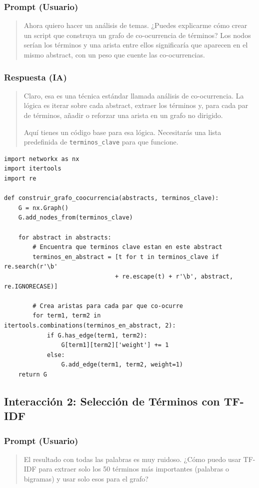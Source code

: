 \documentclass[12pt]{article}
\begin{document}
\subsubsection*{Prompt (Usuario)}
\begin{quote}
Ahora quiero hacer un análisis de temas. ¿Puedes explicarme cómo crear un script que construya un grafo de co-ocurrencia de términos? Los nodos serían los términos y una arista entre ellos significaría que aparecen en el mismo abstract, con un peso que cuente las co-ocurrencias.
\end{quote}

\subsubsection*{Respuesta (IA)}
\begin{quote}
Claro, esa es una técnica estándar llamada análisis de co-ocurrencia. La lógica es iterar sobre cada abstract, extraer los términos y, para cada par de términos, añadir o reforzar una arista en un grafo no dirigido.

Aquí tienes un código base para esa lógica. Necesitarás una lista predefinida de \texttt{terminos\_clave} para que funcione.
\end{quote}
\begin{lstlisting}
import networkx as nx
import itertools
import re

def construir_grafo_coocurrencia(abstracts, terminos_clave):
    G = nx.Graph()
    G.add_nodes_from(terminos_clave)
    
    for abstract in abstracts:
        # Encuentra que terminos clave estan en este abstract
        terminos_en_abstract = [t for t in terminos_clave if re.search(r'\b' 
                               + re.escape(t) + r'\b', abstract, re.IGNORECASE)]
        
        # Crea aristas para cada par que co-ocurre
        for term1, term2 in itertools.combinations(terminos_en_abstract, 2):
            if G.has_edge(term1, term2):
                G[term1][term2]['weight'] += 1
            else:
                G.add_edge(term1, term2, weight=1)
    return G
\end{lstlisting}

\subsection{Interacción 2: Selección de Términos con TF-IDF}

\subsubsection*{Prompt (Usuario)}
\begin{quote}
El resultado con todas las palabras es muy ruidoso. ¿Cómo puedo usar TF-IDF para extraer solo los 50 términos más importantes (palabras o bigramas) y usar solo esos para el grafo?
\end{quote}
\end{document}
